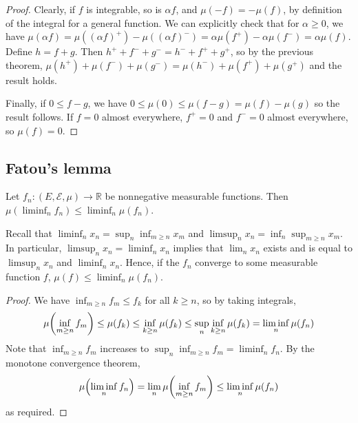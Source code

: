 \begin{proof}
	Clearly, if \( f \) is integrable, so is \( \alpha f \), and \( \mu(-f) = -\mu(f) \), by definition of the integral for a general function.
	We can explicitly check that for \( \alpha \geq 0 \), we have \( \mu(\alpha f) = \mu((\alpha f)^+) - \mu((\alpha f)^-) = \alpha \mu(f^+) - \alpha \mu(f^-) = \alpha \mu(f) \).
	Define \( h = f + g \).
	Then \( h^+ + f^- + g^- = h^- + f^+ + g^+ \), so by the previous theorem, \( \mu(h^+) + \mu(f^-) + \mu(g^-) = \mu(h^-) + \mu(f^+) + \mu(g^+) \) and the result holds.

	Finally, if \( 0 \leq f - g \), we have \( 0 \leq \mu(0) \leq \mu(f - g) = \mu(f) - \mu(g) \) so the result follows.
	If \( f = 0 \) almost everywhere, \( f^+ = 0 \) and \( f^- = 0 \) almost everywhere, so \( \mu(f) = 0 \).
\end{proof}

\subsection{Fatou's lemma}
\begin{lemma}
	Let \( f_n \colon (E, \mathcal E, \mu) \to \mathbb R \) be nonnegative measurable functions.
	Then \( \mu (\liminf_n f_n) \leq \liminf_n \mu(f_n) \).
\end{lemma}
\begin{remark}
	Recall that \( \liminf_n x_n = \sup_n \inf_{m \geq n} x_m \) and \( \limsup_n x_n = \inf_n \sup_{m \geq n} x_m \).
	In particular, \( \limsup_n x_n = \liminf_n x_n \) implies that \( \lim_n x_n \) exists and is equal to \( \limsup_n x_n \) and \( \liminf_n x_n \).
	Hence, if the \( f_n \) converge to some measurable function \( f \), \( \mu(f) \leq \liminf_n \mu(f_n) \).
\end{remark}
\begin{proof}
	We have \( \inf_{m \geq n} f_m \leq f_k \) for all \( k \geq n \), so by taking integrals,
	\[ \mu\qty(\inf_{m \geq n} f_m) \leq \mu(f_k) \leq \inf_{k \geq n} \mu(f_k) \leq \sup_n \inf_{k \geq n} \mu(f_k) = \liminf_n \mu(f_n) \]
	Note that \( \inf_{m \geq n} f_m \) increases to \( \sup_n \inf_{m \geq n} f_m = \liminf_n f_n \).
	By the monotone convergence theorem,
	\[ \mu\qty(\liminf_n f_n) = \lim_n \mu\qty(\inf_{m \geq n} f_m) \leq \liminf_n \mu(f_n) \]
	as required.
\end{proof}

